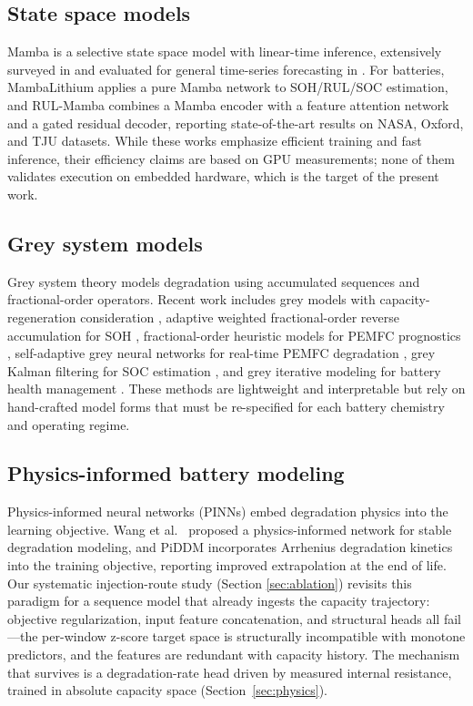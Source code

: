 \subsection{State space models}

Mamba \cite{ref_mamba} is a selective state space model with
linear-time inference, extensively surveyed in \cite{ref_mamba_survey}
and evaluated for general time-series forecasting in
\cite{ref_samamba_tsf}. For batteries, MambaLithium \cite{ref_mambalithium}
applies a pure Mamba network to SOH/RUL/SOC estimation, and RUL-Mamba
\cite{ref_rulmamba} combines a Mamba encoder with a feature attention
network and a gated residual decoder, reporting state-of-the-art
results on NASA, Oxford, and TJU datasets. While these works emphasize
efficient training and fast inference, their efficiency claims are
based on GPU measurements; none of them validates execution on
embedded hardware, which is the target of the present work.

\subsection{Grey system models}

Grey system theory models degradation using accumulated sequences and
fractional-order operators. Recent work includes grey models with
capacity-regeneration consideration \cite{ref_grey_hybrid}, adaptive
weighted fractional-order reverse accumulation for SOH
\cite{ref_grey_frac}, fractional-order heuristic models for PEMFC
prognostics \cite{ref_grey_pemfc}, self-adaptive grey neural networks
for real-time PEMFC degradation \cite{ref_grey_nn}, grey Kalman
filtering for SOC estimation \cite{ref_grey_kalman}, and grey
iterative modeling for battery health management \cite{ref_grey_iter}.
These methods are lightweight and interpretable but rely on
hand-crafted model forms that must be re-specified for each battery
chemistry and operating regime.

\subsection{Physics-informed battery modeling}

Physics-informed neural networks (PINNs) embed degradation physics
into the learning objective. Wang et al.\ \cite{ref_wang_pinn}
proposed a physics-informed network for stable degradation modeling,
and PiDDM \cite{ref_piddm} incorporates Arrhenius degradation kinetics
into the training objective, reporting improved extrapolation at the
end of life. Our systematic injection-route study (Section
\ref{sec:ablation}) revisits this paradigm for a sequence model that
already ingests the capacity trajectory: objective regularization,
input feature concatenation, and structural heads all fail---the
per-window z-score target space is structurally incompatible with
monotone predictors, and the features are redundant with capacity
history. The mechanism that survives is a degradation-rate head
driven by measured internal resistance, trained in absolute capacity
space (Section~\ref{sec:physics}).

